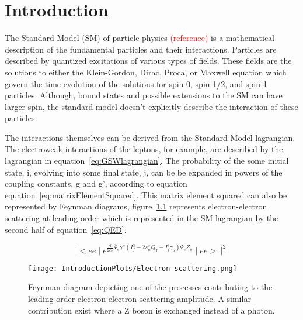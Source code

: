 \chapter{Introduction}
\label{sec:intro}

The Standard Model (SM) of particle physics \textcolor{red}{(reference)} 
is a mathematical description of the fundamental particles and their 
interactions.  Particles are described by quantized excitations of 
various types of fields.  These fields are the solutions to either the
Klein-Gordon, Dirac, Proca, or Maxwell equation which govern the time
evolution of the solutions for spin-0, spin-1/2, and spin-1 particles.
Although, bound states and possible extensions to the SM can have
larger spin, the standard model doesn't explicitly describe the interaction
of these particles.

The interactions themselves can be derived from the Standard Model lagrangian.
The electroweak interactions of the leptons, for example, are described by
the lagrangian in equation~\ref{eq:GSWlagrangian}.  The probability of the
some initial state, i, evolving into some final state, j, can be 
be expanded in powers of the coupling constants, g and g', according to 
equation equation~\ref{eq:matrixElementSquared}.  This matrix element
squared can also be represented by Feynman diagrams, figure~\ref{fyn:eeScattering} 
represents electron-electron scattering at leading order which is 
represented in the SM lagrangian by the second half of equation~\ref{eq:QED}.

\begin{center}
\begin{equation}
\mid<ee\mid e^{\frac{g}{2c_w}\bar{\Psi}_e\gamma^{\mu}(I_f^3-2s_w^2Q_f-I_f^3\gamma_5)\Psi_eZ_{\mu}}\mid ee>\mid^2
\label{eq:matrixElementSquared}
\end{equation}
\end{center}

\begin{figure}
\begin{center}
\texttt{[image: IntroductionPlots/Electron-scattering.png]}
\label{fyn:eeScattering}
\caption{Feynman diagram depicting one of the processes contributing to the leading order
electron-electron scattering amplitude. A similar contribution exist where a Z boson is
exchanged instead of a photon.}
\end{center}
\end{figure}

